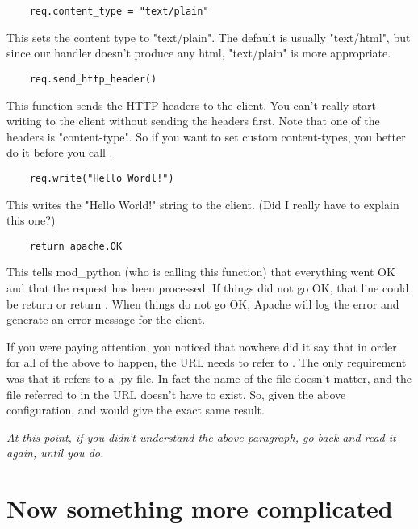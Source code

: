 \begin{enumerate}
\begin{verbatim}
    req.content_type = "text/plain"
\end{verbatim}
This sets the content type to "text/plain". The default is usually
"text/html", but since our handler doesn't produce any html,
"text/plain" is more appropriate.


\begin{verbatim}
    req.send_http_header()
\end{verbatim}
This function sends the HTTP headers to the client. You can't really
start writing to the client without sending the headers first. Note
that one of the headers is "content-type". So if you want to set
custom content-types, you better do it before you call
.


\begin{verbatim}
    req.write("Hello Wordl!")
\end{verbatim}
This writes the "Hello World!" string to the client. (Did I really
have to explain this one?)


\begin{verbatim}
    return apache.OK
\end{verbatim}
This tells mod_python (who is calling this function) that everything
went OK and that the request has been processed. If things did not go
OK, that line could be return 
or return . When things do not go OK,
Apache will log the error and generate an error message for the
client.

 If you were paying attention, you noticed that
nowhere did it say that in order for all of the above to happen, the
URL needs to refer to . The only requirement was
that it refers to a .py file. In fact the name of the file doesn't
matter, and the file referred to in the URL doesn't have to exist. So,
given the above configuration,
 and
 would give the exact same
result.

 \emph{At this point, if you didn't understand the above paragraph, go back and read it again, until you do.}

\end{enumerate}

\section{Now something more complicated\label{tut-more-complicated}}


